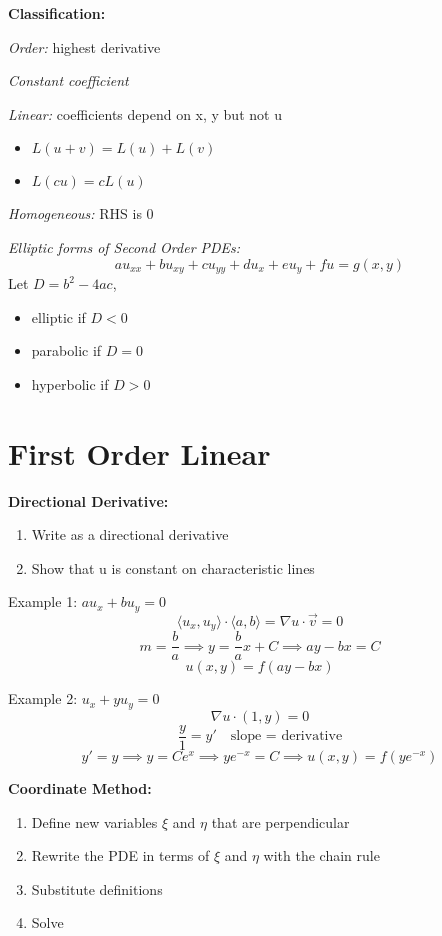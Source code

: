 \documentclass[12pt]{article}
\newcommand{\brak}[1]{\langle #1 \rangle}
\begin{document}
\textbf{Classification:}

\emph{Order:} highest derivative 

\emph{Constant coefficient}

\emph{Linear:} coefficients depend on x, y but not u 
\begin{itemize}
    \item $L(u + v) = L(u) + L(v)$
    \item $L(cu) = cL(u)$
\end{itemize}

\emph{Homogeneous:} RHS is 0 

\emph{Elliptic forms of Second Order PDEs:}
\[au_{xx} + bu_{xy} + cu_{yy} + du_x + eu_y + fu = g(x,y)\]
Let $D = b^2 - 4ac$, 
\begin{itemize}
    \item elliptic if $D < 0$
    \item parabolic if $D = 0$
    \item hyperbolic if $D > 0$
\end{itemize}

\section*{First Order Linear}
\textbf{Directional Derivative:}
\begin{enumerate}
    \item Write as a directional derivative
    \item Show that u is constant on characteristic lines 
\end{enumerate}

Example 1: $au_x + bu_y = 0$
\[\brak{u_x, u_y} \cdot \brak{a, b} = \nabla u \cdot \vec{v} = 0\]
\[m = \frac{b}{a} \implies y = \frac{b}{a}x + C \implies ay - bx = C\]
\[u(x, y) = f(ay - bx)\]

Example 2: $u_x + yu_y = 0$
\[\nabla u \cdot (1, y) = 0\]
\[\frac{y}{1} = y' \quad \text{slope = derivative} \]
\[y' = y \implies y = Ce^x \implies ye^{-x} = C \implies u(x, y) = f(ye^{-x})\]

\textbf{Coordinate Method:}
\begin{enumerate}
    \item Define new variables $\xi$ and $\eta$ that are perpendicular
    \item Rewrite the PDE in terms of $\xi$ and $\eta$ with the chain rule
    \item Substitute definitions 
    \item Solve
\end{enumerate}
\end{document}
